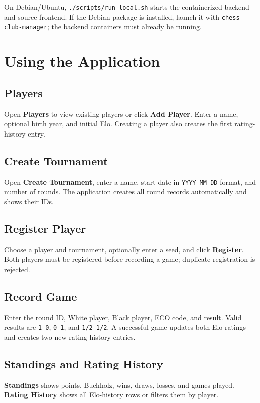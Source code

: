 \documentclass[11pt,a4paper]{article}
\begin{document}
On Debian/Ubuntu, \texttt{./scripts/run-local.sh} starts the containerized backend and source frontend. If the Debian package is installed, launch it with \texttt{chess-club-manager}; the backend containers must already be running.

\section{Using the Application}
\subsection{Players}
Open \textbf{Players} to view existing players or click \textbf{Add Player}. Enter a name, optional birth year, and initial Elo. Creating a player also creates the first rating-history entry.

\subsection{Create Tournament}
Open \textbf{Create Tournament}, enter a name, start date in \texttt{YYYY-MM-DD} format, and number of rounds. The application creates all round records automatically and shows their IDs.

\subsection{Register Player}
Choose a player and tournament, optionally enter a seed, and click \textbf{Register}. Both players must be registered before recording a game; duplicate registration is rejected.

\subsection{Record Game}
Enter the round ID, White player, Black player, ECO code, and result. Valid results are \texttt{1-0}, \texttt{0-1}, and \texttt{1/2-1/2}. A successful game updates both Elo ratings and creates two new rating-history entries.

\subsection{Standings and Rating History}
\textbf{Standings} shows points, Buchholz, wins, draws, losses, and games played. \textbf{Rating History} shows all Elo-history rows or filters them by player.
\end{document}
